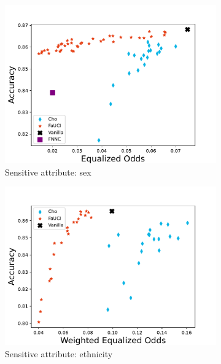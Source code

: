 \begin{figure}
    \begin{subfigure}[]{\onethirdsize}
        \centering
        \includegraphics[width=\columnwidth]{figures/fauci/accuracy/equalized_odds_sex}
        \caption{Sensitive attribute: sex}
        \label{fig:eo-sex}
    \end{subfigure}
    \begin{subfigure}[]{\onethirdsize}
        \centering
        \includegraphics[width=\columnwidth]{figures/fauci/accuracy/equalized_odds_ethnicity}
        \caption{Sensitive attribute: ethnicity}
        \label{fig:eo-ethnicity}
    \end{subfigure}
    \begin{subfigure}[]{\onethirdsize}

\end{subfigure}
\end{figure}
